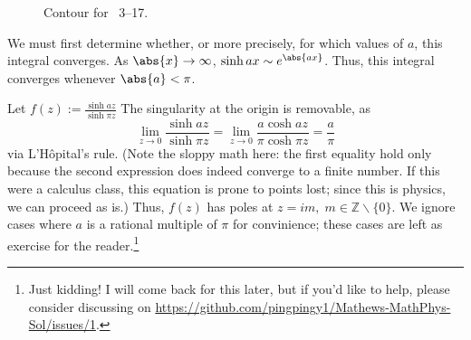 \item

\begin{figure}[ht]
	\centering
	\caption{Contour for ~3--17.}%
	\label{fig:problem3-17}
\end{figure}

We must first determine whether, or more precisely, for which values of $a$, this integral converges.
As $\abs{x} \rightarrow \infty$, $\sinh ax \sim e^{\abs{ax}}$.
Thus, this integral converges whenever $\abs{a} < \pi$.

Let $f(z) := \frac{\sinh az}{\sinh \pi z}$
The singularity at the origin is removable, as
\[
    \lim_{z \rightarrow 0} \frac{\sinh az}{\sinh \pi z}
    = \lim_{z \rightarrow 0} \frac{a \cosh az}{\pi \cosh \pi z}
    = \frac{a}{\pi}
\]
via L'H\^opital's rule.
(Note the sloppy math here:
the first equality hold only because the second expression does indeed converge to a finite number.
If this were a calculus class, this equation is prone to points lost;
since this is physics, we can proceed as is.)
Thus, $f(z)$ has poles at $z = im,\; m \in \mathbb{Z} \backslash \{0\}$.
We ignore cases where $a$ is a rational multiple of $\pi$ for convinience;
these cases are left as exercise for the reader.\footnote{
Just kidding!
I will come back for this later, but if you'd like to help,
please consider discussing on \url{https://github.com/pingpingy1/Mathews-MathPhys-Sol/issues/1}.
}

